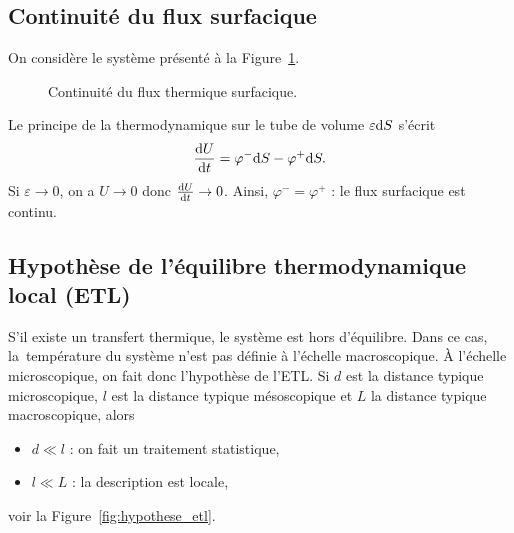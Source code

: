     \subsection{Continuité du flux surfacique}

        On considère le système présenté à la Figure~\ref{fig:continuite_flux_surfacique}.

        \begin{figure}
            \centering
            \caption{Continuité du flux thermique surfacique.}    
            \label{fig:continuite_flux_surfacique}
        \end{figure}

        Le principe de la thermodynamique sur le tube de volume $\varepsilon\mathrm{d} S$ s'écrit
        \begin{equation}
            \frac{\mathrm{d} U}{\mathrm{d} t}=\varphi^{-}\mathrm{d} S-\varphi^{+}\mathrm{d} S.
        \end{equation}
        Si $\varepsilon\to0$, on a $U\to0$ donc $\frac{\mathrm{d} U}{\mathrm{d} t}\to0$. Ainsi, $\varphi^{-}=\varphi^{+}$ : le flux surfacique est continu.

    \subsection{Hypothèse de l'équilibre thermodynamique local (ETL)}

        S'il existe un transfert thermique, le système est hors d'équilibre. Dans ce cas, \og la\fg~température du système n'est pas définie à l'échelle macroscopique.
        À l'échelle microscopique, on fait donc l'hypothèse de l'ETL. Si $d$ est la distance typique microscopique, $l$ est la distance typique mésoscopique et $L$ la distance typique macroscopique, alors
        \begin{itemize}
            \item $d\ll l$ : on fait un traitement statistique,
            \item $l\ll L$ : la description est locale,
        \end{itemize}
        voir la Figure~\ref{fig:hypothese_etl}.

